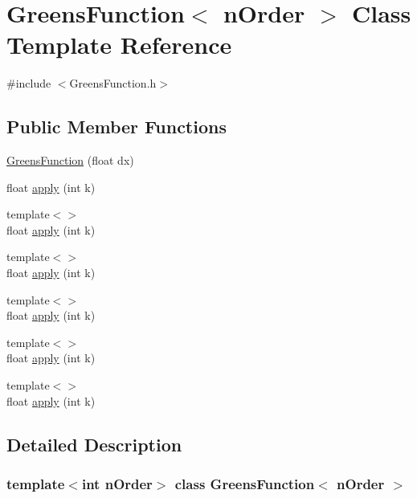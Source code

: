 \section{GreensFunction$<$ nOrder $>$ Class Template Reference}
\label{classGreensFunction}


{\ttfamily \#include $<$GreensFunction.h$>$}

\subsection*{Public Member Functions}
\begin{DoxyCompactItemize}
\item 
\hyperlink{classGreensFunction_a8c51bdaf6e812200daa73d4b9b82cc50}{GreensFunction} (float dx)
\item 
float \hyperlink{classGreensFunction_a1440d9f402b491517bbeae7b0b185efb}{apply} (int k)
\item 
{\footnotesize template$<$$>$ }\\float \hyperlink{classGreensFunction_a8550135a0b0bdbd22042766daa7d0e91}{apply} (int k)
\item 
{\footnotesize template$<$$>$ }\\float \hyperlink{classGreensFunction_a8deeec4645b23ce64dfcf92fde4ace48}{apply} (int k)
\item 
{\footnotesize template$<$$>$ }\\float \hyperlink{classGreensFunction_a3f675ed09bff6149f83a7ca6c2eb48f1}{apply} (int k)
\item 
{\footnotesize template$<$$>$ }\\float \hyperlink{classGreensFunction_af62d4219d35a07357c0ed9f539f946fc}{apply} (int k)
\item 
{\footnotesize template$<$$>$ }\\float \hyperlink{classGreensFunction_a867501f77e3dc2ecdc45daa3b2c12796}{apply} (int k)
\end{DoxyCompactItemize}


\subsection{Detailed Description}
\subsubsection*{template$<$int nOrder$>$ class GreensFunction$<$ nOrder $>$}



